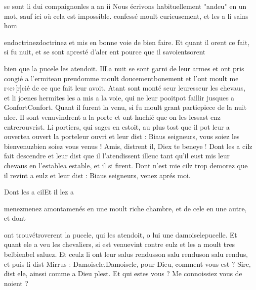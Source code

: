 \documentclass{article}
\begin{document}
\begin{pages}
                  se sont li dui compaignonles a an ii
                  Nous écrivons habituellement "andeu" en un mot, sauf
                     ici où cela est impossible.
                confessé moult curieusement, et les a 
                  li sains hom
               
                  endoctrinezdoctrinez et mis en bonne voie de bien faire. Et quant il orent ce fait, si fu nuit, et
               se sont apresté d’aler 
                  ent pource que il 
                  savoientsorent
               
                  bien que la pucele les atendoit. 
                  IlLa nuit se sont garni de leur armes et ont pris congié 
                  a l’ermiteau preudomme moult 
                  doucementbonement et l’ont moult me
                  r‹c›[r]cié de ce que fait leur avoit. Atant sont monté 
                  seur leuresseur les
               chevaus, et li joenes
                  hermites les a mis a la voie, qui ne leur 
                  pooitpot faillir jusques a 
                     GonfortConfort. Quant il furent la venu, si fu moult grant 
                  partiepiece de la nuit alee. Il 
                  sont venuvindrent a la porte et ont huchié que on les 
                  lessast enz entrerouvrist. Li portiers, qui sages en
               estoit, 
                  au plus tost que il pot leur 
                        a ouvertea ouvert la porteleur ouvri et leur dist : Biaus seigneurs, 
                     vous soiez les bienvenuzbien soiez vous venus !
               Amis, distrent il, Diex te beneye ! Dont les
               a cilz fait descendre et leur dist que il
                  l’atendissent illeuc tant qu’il eust mis leur chevaus 
                     en l’establea estable, 
                  et il si firent. Dont n’est mie cilz trop demorez que 
                  il revint 
                  a eulz et leur dist : Biaus seigneurs, venez aprés
                  moi.
               
                  Dont les a cilEt il lez a
               
                  menezmenez amontamenés en une moult riche chambre, et de cele en une autre, et 
                  dont
               
                  ont trouvétroverent
               la pucele, qui les atendoit, o lui une 
                  damoiselepucelle. Et quant ele a veu les chevaliers, si 
                  est venuevint contre eulz et les a moult 
                  tres belbienbel saluez. Et ceulz li ont 
                  leur salus rendusson salu renduson salu rendus, et puis li dist Mirrus : 
                     Damoisele,Damoisele, pour Dieu, comment vous est ?
               Sire, dist ele, ainssi comme 
                     a Dieu plest. Et qui estes vous ? 
                     Me connoissiez vous de noient ?
               

\end{pages}
\end{document}
